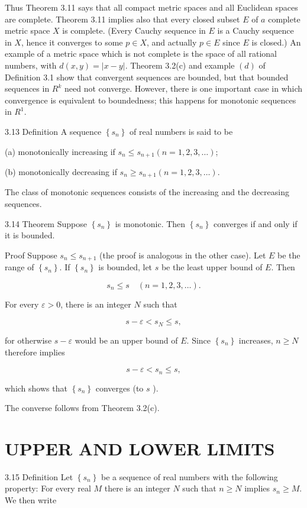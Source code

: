 \documentclass[10pt]{article}
\begin{document}
Thus Theorem 3.11 says that all compact metric spaces and all Euclidean spaces are complete. Theorem 3.11 implies also that every closed subset $E$ of $a$ complete metric space $X$ is complete. (Every Cauchy sequence in $E$ is a Cauchy sequence in $X$, hence it converges to some $p \in X$, and actually $p \in E$ since $E$ is closed.) An example of a metric space which is not complete is the space of all rational numbers, with $d(x, y)=|x-y|$. Theorem 3.2(c) and example $(d)$ of Definition 3.1 show that convergent sequences are bounded, but that bounded sequences in $R^{k}$ need not converge. However, there is one important case in which convergence is equivalent to boundedness; this happens for monotonic sequences in $R^{1}$.

3.13 Definition A sequence $\left\{s_{n}\right\}$ of real numbers is said to be

(a) monotonically increasing if $s_{n} \leq s_{n+1}(n=1,2,3, \ldots)$;

(b) monotonically decreasing if $s_{n} \geq s_{n+1}(n=1,2,3, \ldots)$.

The class of monotonic sequences consists of the increasing and the decreasing sequences.

3.14 Theorem Suppose $\left\{s_{n}\right\}$ is monotonic. Then $\left\{s_{n}\right\}$ converges if and only if it is bounded.

Proof Suppose $s_{n} \leq s_{n+1}$ (the proof is analogous in the other case). Let $E$ be the range of $\left\{s_{n}\right\}$. If $\left\{s_{n}\right\}$ is bounded, let $s$ be the least upper bound of $E$. Then

$$
s_{n} \leq s \quad(n=1,2,3, \ldots) .
$$

For every $\varepsilon>0$, there is an integer $N$ such that

$$
s-\varepsilon<s_{N} \leq s,
$$

for otherwise $s-\varepsilon$ would be an upper bound of $E$. Since $\left\{s_{n}\right\}$ increases, $n \geq N$ therefore implies

$$
s-\varepsilon<s_{n} \leq s,
$$

which shows that $\left\{s_{n}\right\}$ converges (to $s$ ).

The converse follows from Theorem 3.2(c).

\section{UPPER AND LOWER LIMITS}
3.15 Definition Let $\left\{s_{n}\right\}$ be a sequence of real numbers with the following property: For every real $M$ there is an integer $N$ such that $n \geq N$ implies $s_{n} \geq M$. We then write
\end{document}
